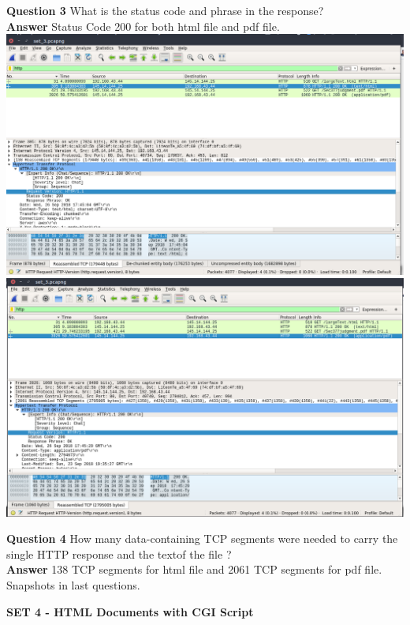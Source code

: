 \documentclass[14pt]{extarticle}
\begin{document}
    \noindent
    \textbf{\large Question 3}
    What is the status code and phrase in the response?\\
    \textbf{\large Answer}
    Status Code 200 for both html file and pdf file.\\[10pt]
    \includegraphics[scale=0.40]{s3_2}\\[30pt]
    \includegraphics[scale=0.40]{s3_3}\\[10pt]
    \vspace{1cm}
    
    \noindent
    \textbf{\large Question 4}
    How many data-containing TCP segments were needed to carry the single HTTP response and the textof the file ?\\
    \textbf{\large Answer}
    138 TCP segments for html file and 2061 TCP segments for pdf file. Snapshots in last questions.
    \vspace{1cm}

    \begin{center}
        {\large \textbf{SET 4 - HTML Documents with CGI Script }}
    \end{center}
    
\end{document}
